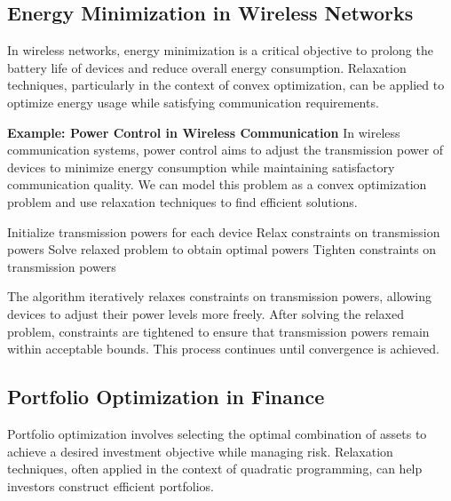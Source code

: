 \documentclass[12pt]{book} %
\begin{document}
\subsection{Energy Minimization in Wireless Networks}
In wireless networks, energy minimization is a critical objective to prolong the battery life of devices and reduce overall energy consumption. Relaxation techniques, particularly in the context of convex optimization, can be applied to optimize energy usage while satisfying communication requirements.

\textbf{Example: Power Control in Wireless Communication}
In wireless communication systems, power control aims to adjust the transmission power of devices to minimize energy consumption while maintaining satisfactory communication quality. We can model this problem as a convex optimization problem and use relaxation techniques to find efficient solutions.
\FloatBarrier
\begin{algorithm}
\caption{Relaxation-based Power Control Algorithm}
\begin{algorithmic}[1]
\State Initialize transmission powers for each device
\Repeat
    \State Relax constraints on transmission powers
    \State Solve relaxed problem to obtain optimal powers
    \State Tighten constraints on transmission powers
\end{algorithmic}
\end{algorithm}
\FloatBarrier
The algorithm iteratively relaxes constraints on transmission powers, allowing devices to adjust their power levels more freely. After solving the relaxed problem, constraints are tightened to ensure that transmission powers remain within acceptable bounds. This process continues until convergence is achieved.

\subsection{Portfolio Optimization in Finance}
Portfolio optimization involves selecting the optimal combination of assets to achieve a desired investment objective while managing risk. Relaxation techniques, often applied in the context of quadratic programming, can help investors construct efficient portfolios.
\end{document}
